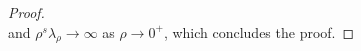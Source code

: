 \documentclass[10pt,a4paper]{amsart}
\newcommand{\R}{\mathbb{R}}
\begin{document}
\begin{proof}
\begin{equation}
\end{equation}
and $\rho^s\lambda_\rho\to\infty$ as $\rho\to 0^+$, which concludes the proof. %

\end{proof}
\end{document}
